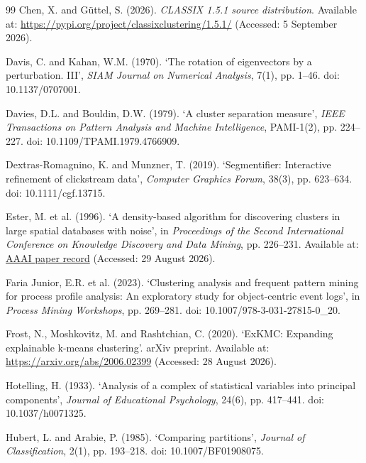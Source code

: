 \begin{thebibliography}{99}
Chen, X. and G\"uttel, S. (2026). \emph{CLASSIX 1.5.1 source distribution}. Available at: \url{https://pypi.org/project/classixclustering/1.5.1/} (Accessed: 5 September 2026).

Davis, C. and Kahan, W.M. (1970). `The rotation of eigenvectors by a perturbation. III', \emph{SIAM Journal on Numerical Analysis}, 7(1), pp. 1--46. doi: 10.1137/0707001.

Davies, D.L. and Bouldin, D.W. (1979). `A cluster separation measure', \emph{IEEE Transactions on Pattern Analysis and Machine Intelligence}, PAMI-1(2), pp. 224--227. doi: 10.1109/TPAMI.1979.4766909.

Dextras-Romagnino, K. and Munzner, T. (2019). `Segmentifier: Interactive refinement of clickstream data', \emph{Computer Graphics Forum}, 38(3), pp. 623--634. doi: 10.1111/cgf.13715.

Ester, M. et al. (1996). `A density-based algorithm for discovering clusters in large spatial databases with noise', in \emph{Proceedings of the Second International Conference on Knowledge Discovery and Data Mining}, pp. 226--231. Available at: \href{https://aaai.org/papers/kdd96-037-a-density-based-algorithm-for-discovering-clusters-in-large-spatial-databases-with-noise/}{AAAI paper record} (Accessed: 29 August 2026).

Faria Junior, E.R. et al. (2023). `Clustering analysis and frequent pattern mining for process profile analysis: An exploratory study for object-centric event logs', in \emph{Process Mining Workshops}, pp. 269--281. doi: 10.1007/978-3-031-27815-0\_20.

Frost, N., Moshkovitz, M. and Rashtchian, C. (2020). `ExKMC: Expanding explainable k-means clustering'. arXiv preprint. Available at: \url{https://arxiv.org/abs/2006.02399} (Accessed: 28 August 2026).

Hotelling, H. (1933). `Analysis of a complex of statistical variables into principal components', \emph{Journal of Educational Psychology}, 24(6), pp. 417--441. doi: 10.1037/h0071325.

Hubert, L. and Arabie, P. (1985). `Comparing partitions', \emph{Journal of Classification}, 2(1), pp. 193--218. doi: 10.1007/BF01908075.


\end{thebibliography}
